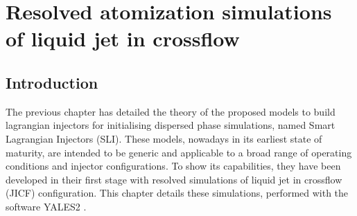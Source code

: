 \chapter{Resolved atomization simulations of liquid jet in crossflow}
\label{ch5:jicf_resolved_simulations}



%
%
%	
%	
%	
%	
%	
%	
%	
%		
%			
%			
%	
%		
%	
%		
%			
%		
%
%

\section{Introduction}

The previous chapter has detailed the theory of the proposed models to build lagrangian injectors for initialising dispersed phase simulations, named Smart Lagrangian Injectors (SLI). These models, nowadays in its earliest state of maturity, are intended to be generic and applicable to a broad range of operating conditions and injector configurations. To show its capabilities, they have been developed in their first stage with resolved simulations of liquid jet in crossflow (JICF) configuration. This chapter details these simulations, performed with the software YALES2 . %


